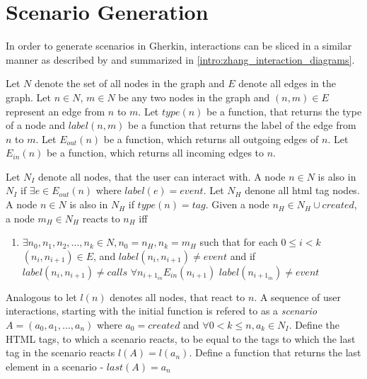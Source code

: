 \section{Scenario Generation}
\label{concept:scenario_generation}
In order to generate scenarios in Gherkin, interactions can be sliced in a similar manner as described by \textcite{zhang2019scenario} and summarized in \ref{intro:zhang_interaction_diagrams}.

Let $N$ denote the set of all nodes in the graph and $E$ denote all edges in the graph. Let $n \in N$, $m \in N$ be any two nodes in the graph and $(n, m) \in E $ represent an edge from $n$ to $m$. Let $type(n)$ be a function, that returns the type of a node and $label(n, m)$ be a function that returns the label of the edge from $n$ to $m$. Let $E_{out}(n)$ be a function, which returns all outgoing edges of $n$.
Let $E_{in}(n)$ be a function, which returns all incoming edges to $n$.

Let $N_I$ denote all nodes, that the user can interact with. A node $n \in N$ is also in $N_I$ if $\exists e \in E_{out}(n)$ where $label(e) = event$. Let $N_H$ denone all html tag nodes. A node $n \in N$ is also in $N_H$ if $type(n) = tag$. 
Given a node $n_H \in N_H \cup {created}$, a node $m_H \in N_H$ reacts to $n_H$ iff
\begin{enumerate}
    \item $\exists n_0,n_1,n_2, \ldots,n_k \in N, n_0=n_H,n_k=m_H$ such that for each $0 \leq i < k  $ $(n_i,n_{i+1}) \in E$, and $label(n_i,n_{i+1})\neq event$ and if $label(n_i,n_{i+1}) \neq calls$ $\forall n_{i+1_{in}} E_{in}(n_{i+1})$ $label(n_{i+1_{in}}) \neq event$ 
\end{enumerate}

Analogous to \cite{zhang2019scenario} let $l(n)$ denotes all nodes, that react to $n$. A sequence of user interactions, starting with the initial function is refered to as a \textit{scenario} $A=(a_0,a_1,\ldots, a_n)$ where $a_0=created$ and $\forall0 < k \leq n, a_k \in N_I$. 
Define the HTML tags, to which a scenario reacts, to be equal to the tags to which the last tag in the scenario reacts $l(A)=l(a_n)$. Define a function that returns the last element in a scenario - $last(A) = a_n$

